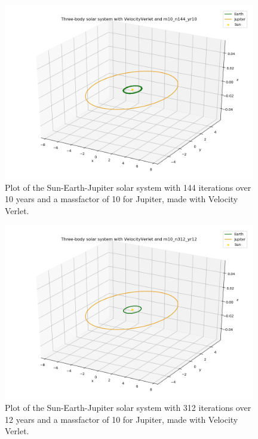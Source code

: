 \documentclass{article}
\begin{document}
    \begin{figure}[H]
        \centering
        \includegraphics[width = 11cm]{img/plot3D_S_E_J_V_m10_n144_yr10.png}
        \caption{Plot of the Sun-Earth-Jupiter solar system with 144 iterations over 10 years and a massfactor of 10 for Jupiter, made with Velocity Verlet.}
        \label{fig:plot3D_S_E_J_V_m10_n144_yr10}
    \end{figure}

    \begin{figure}[H]
        \centering
        \includegraphics[width = 11cm]{img/plot3D_S_E_J_V_m10_n312_yr12.png}
        \caption{Plot of the Sun-Earth-Jupiter solar system with 312 iterations over 12 years and a massfactor of 10 for Jupiter, made with Velocity Verlet.}
        \label{fig:plot3D_S_E_J_V_m10_n312_yr12}
    \end{figure}
\end{document}
